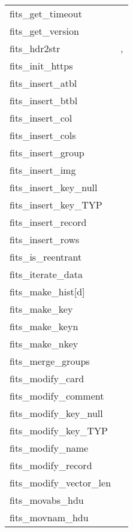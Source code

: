 \documentclass[11pt]{book}
\begin{document}
\newpage
\begin{tabular}{lr}
fits\_get\_timeout    & \pageref{ffgtmo} \\
fits\_get\_version    & \pageref{ffvers} \\
fits\_hdr2str         & \pageref{ffhdr2str}, \pageref{hdr2str} \\
fits\_init\_https  & \pageref{ffihtps} \\
fits\_insert\_atbl    & \pageref{ffitab} \\
fits\_insert\_btbl    & \pageref{ffibin} \\
fits\_insert\_col   & \pageref{fficol} \\
fits\_insert\_cols  & \pageref{fficls} \\
fits\_insert\_group  & \pageref{ffgtis} \\
fits\_insert\_img     & \pageref{ffiimg} \\
fits\_insert\_key\_null   & \pageref{ffikyu} \\
fits\_insert\_key\_TYP    & \pageref{ffikyx} \\
fits\_insert\_record     & \pageref{ffirec} \\
fits\_insert\_rows  & \pageref{ffirow} \\
fits\_is\_reentrant  & \pageref{reentrant} \\
fits\_iterate\_data   & \pageref{ffiter} \\
fits\_make\_hist[d]      & \pageref{makehist} \\
fits\_make\_key       & \pageref{ffmkky} \\
fits\_make\_keyn      & \pageref{ffkeyn} \\
fits\_make\_nkey      & \pageref{ffnkey} \\
fits\_merge\_groups  & \pageref{ffgtmg} \\
fits\_modify\_card       & \pageref{ffmcrd} \\
fits\_modify\_comment    & \pageref{ffmcom} \\
fits\_modify\_key\_null   & \pageref{ffmkyu} \\
fits\_modify\_key\_TYP    & \pageref{ffmkyx} \\
fits\_modify\_name       & \pageref{ffmnam} \\
fits\_modify\_record     & \pageref{ffmrec} \\
fits\_modify\_vector\_len  & \pageref{ffmvec} \\
fits\_movabs\_hdu     & \pageref{ffmahd} \\
fits\_movnam\_hdu     & \pageref{ffmnhd} \\

\end{tabular}
\end{document}
